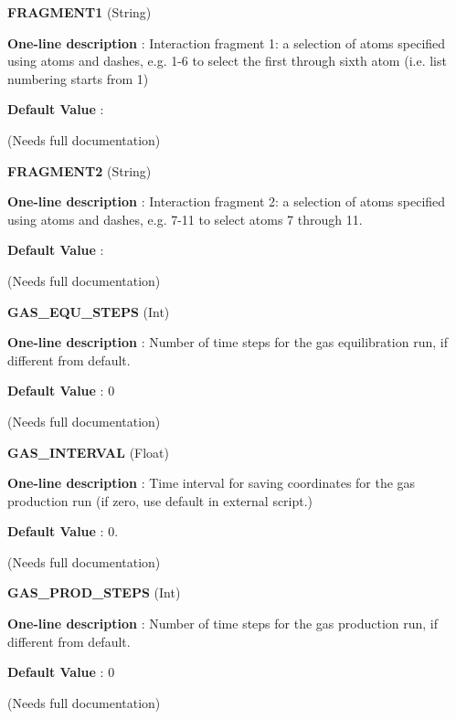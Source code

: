 \begin{DoxyItemize}
\item {\bfseries  F\-R\-A\-G\-M\-E\-N\-T1 } (String) \par
{\bfseries  One-\/line description }\-: Interaction fragment 1\-: a selection of atoms specified using atoms and dashes, e.\-g. 1-\/6 to select the first through sixth atom (i.\-e. list numbering starts from 1) \par
{\bfseries  Default Value }\-: \par
(Needs full documentation)\end{DoxyItemize}
\begin{DoxyItemize}
\item {\bfseries  F\-R\-A\-G\-M\-E\-N\-T2 } (String) \par
{\bfseries  One-\/line description }\-: Interaction fragment 2\-: a selection of atoms specified using atoms and dashes, e.\-g. 7-\/11 to select atoms 7 through 11. \par
{\bfseries  Default Value }\-: \par
(Needs full documentation)\end{DoxyItemize}
\begin{DoxyItemize}
\item {\bfseries  G\-A\-S\-\_\-\-E\-Q\-U\-\_\-\-S\-T\-E\-P\-S } (Int) \par
{\bfseries  One-\/line description }\-: Number of time steps for the gas equilibration run, if different from default. \par
{\bfseries  Default Value }\-: 0 \par
(Needs full documentation)\end{DoxyItemize}
\begin{DoxyItemize}
\item {\bfseries  G\-A\-S\-\_\-\-I\-N\-T\-E\-R\-V\-A\-L } (Float) \par
{\bfseries  One-\/line description }\-: Time interval for saving coordinates for the gas production run (if zero, use default in external script.) \par
{\bfseries  Default Value }\-: 0. \par
(Needs full documentation)\end{DoxyItemize}
\begin{DoxyItemize}
\item {\bfseries  G\-A\-S\-\_\-\-P\-R\-O\-D\-\_\-\-S\-T\-E\-P\-S } (Int) \par
{\bfseries  One-\/line description }\-: Number of time steps for the gas production run, if different from default. \par
{\bfseries  Default Value }\-: 0 \par
(Needs full documentation)\end{DoxyItemize}
